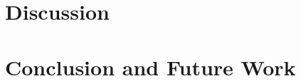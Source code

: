 \documentclass[journal]{IEEEtran}
\begin{document}
\section{Discussion}



\lipsum[1]


\lipsum[1]



\section{Conclusion and Future Work}


%
%



%
%
\end{document}
